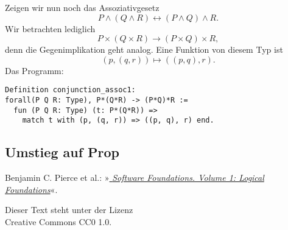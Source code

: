 \documentclass[a4paper,10pt,fleqn,twocolumn,twoside,dvipdfmx]{scrartcl}
\numberwithin{equation}{section}
\begin{document}
Zeigen wir nun noch das Assoziativgesetz
\begin{equation}
P\land (Q\land R) \leftrightarrow (P\land Q)\land R.
\end{equation}
Wir betrachten lediglich
\begin{equation}
P\times (Q\times R) \to (P\times Q)\times R,
\end{equation}
denn die Gegenimplikation geht analog.
Eine Funktion von diesem Typ ist
\begin{equation}
(p, (q, r))\mapsto ((p, q), r).
\end{equation}
Das Programm:
\begin{lstlisting}[language=Coq]
Definition conjunction_assoc1:
forall(P Q R: Type), P*(Q*R) -> (P*Q)*R :=
  fun (P Q R: Type) (t: P*(Q*R)) =>
    match t with (p, (q, r)) => ((p, q), r) end.
\end{lstlisting}

\subsection{Umstieg auf Prop}

\newpage
\begin{thebibliography}{00}
 Benjamin C. Pierce et al.:
»\href{https://softwarefoundations.cis.upenn.edu/lf-current/index.html}{%
\emph{Software Foundations. Volume 1: Logical Foundations}}«.
\end{thebibliography}


\vfill
\noindent
{\small Dieser Text steht unter der Lizenz\\
Creative Commons CC0 1.0.}
\end{document}
